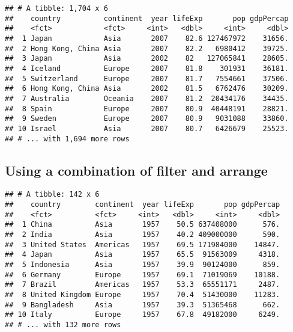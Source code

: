 \documentclass[]{article}
\newenvironment{Shaded}{\begin{snugshade}}{\end{snugshade}}
\newcommand{\KeywordTok}[1]{\textcolor[rgb]{0.13,0.29,0.53}{\textbf{#1}}}
\newcommand{\DecValTok}[1]{\textcolor[rgb]{0.00,0.00,0.81}{#1}}
\newcommand{\StringTok}[1]{\textcolor[rgb]{0.31,0.60,0.02}{#1}}
\newcommand{\CommentTok}[1]{\textcolor[rgb]{0.56,0.35,0.01}{\textit{#1}}}
\newcommand{\OperatorTok}[1]{\textcolor[rgb]{0.81,0.36,0.00}{\textbf{#1}}}
\newcommand{\NormalTok}[1]{#1}
\begin{document}
\begin{Shaded}
\end{Shaded}

\begin{verbatim}
## # A tibble: 1,704 x 6
##    country          continent  year lifeExp       pop gdpPercap
##    <fct>            <fct>     <int>   <dbl>     <int>     <dbl>
##  1 Japan            Asia       2007    82.6 127467972    31656.
##  2 Hong Kong, China Asia       2007    82.2   6980412    39725.
##  3 Japan            Asia       2002    82   127065841    28605.
##  4 Iceland          Europe     2007    81.8    301931    36181.
##  5 Switzerland      Europe     2007    81.7   7554661    37506.
##  6 Hong Kong, China Asia       2002    81.5   6762476    30209.
##  7 Australia        Oceania    2007    81.2  20434176    34435.
##  8 Spain            Europe     2007    80.9  40448191    28821.
##  9 Sweden           Europe     2007    80.9   9031088    33860.
## 10 Israel           Asia       2007    80.7   6426679    25523.
## # ... with 1,694 more rows
\end{verbatim}

\subsection{Using a combination of filter and
arrange}\label{using-a-combination-of-filter-and-arrange}

\begin{Shaded}
\end{Shaded}

\begin{verbatim}
## # A tibble: 142 x 6
##    country        continent  year lifeExp       pop gdpPercap
##    <fct>          <fct>     <int>   <dbl>     <int>     <dbl>
##  1 China          Asia       1957    50.5 637408000      576.
##  2 India          Asia       1957    40.2 409000000      590.
##  3 United States  Americas   1957    69.5 171984000    14847.
##  4 Japan          Asia       1957    65.5  91563009     4318.
##  5 Indonesia      Asia       1957    39.9  90124000      859.
##  6 Germany        Europe     1957    69.1  71019069    10188.
##  7 Brazil         Americas   1957    53.3  65551171     2487.
##  8 United Kingdom Europe     1957    70.4  51430000    11283.
##  9 Bangladesh     Asia       1957    39.3  51365468      662.
## 10 Italy          Europe     1957    67.8  49182000     6249.
## # ... with 132 more rows
\end{verbatim}
\end{document}
